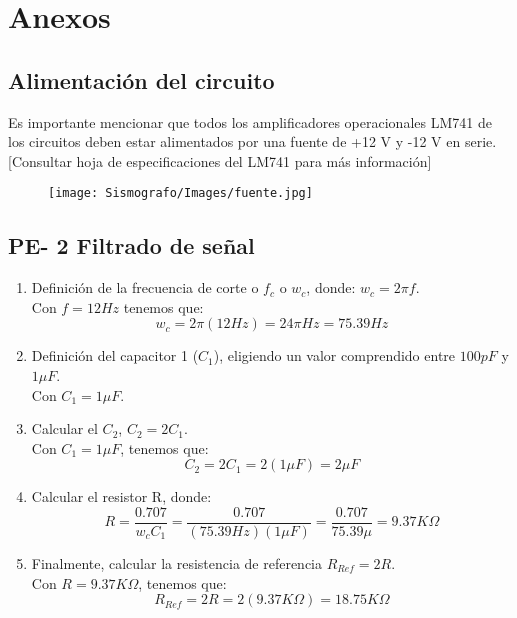\documentclass[12pt]{article}
\begin{document}
	\section{Anexos}
	    \subsection{Alimentación del circuito}
	        Es importante mencionar que todos los amplificadores operacionales LM741 de los circuitos deben estar alimentados por una fuente de +12 V y -12 V en serie. [Consultar hoja de especificaciones del LM741 para más información]
	        
	        \begin{figure}[h!]
                \centering
                \texttt{[image: Sismografo/Images/fuente.jpg]}
            \end{figure} 
	       
	    \subsection{PE- 2 Filtrado de señal}
            \begin{enumerate}
        		\item Definición de la frecuencia de corte o $f_{c}$ o $w_{c}$, donde: $w_{c}=2 \pi f$.					\\
        				Con $ f=12Hz $ tenemos que:
        				$$ w_{c}=2\pi (12Hz) = 24 \pi Hz = 75.39 Hz $$
        		\item Definición del capacitor 1 ($C_{1}$), eligiendo un valor comprendido entre $100pF$ y $1\mu F$.	\\
        				Con $C_{1}=1\mu F$.
        		\item Calcular el $C_{2}$,  $C_{2}=2C_{1}$.																\\
        				Con $C_{1}=1\mu F$, tenemos que:
        				$$ C_{2}=2C_{1} = 2(1\mu F) = 2 \mu F $$
        		\item Calcular el resistor R, donde:																	\\
        				$$ R = \frac{0.707}{w_{c}C_{1}} = \frac{0.707}{(75.39 Hz)(1 \mu F)} = \frac{0.707}{75.39\mu} = 9.37 K\Omega $$

        	    \item Finalmente, calcular la resistencia de referencia $R_{Ref}=2R$.\\
        	    Con $R=9.37 K\Omega $, tenemos que:
        	    $$ R_{Ref}=2R = 2(9.37 K\Omega) = 18.75 K\Omega $$
        	\end{enumerate}
        	
\end{document}
